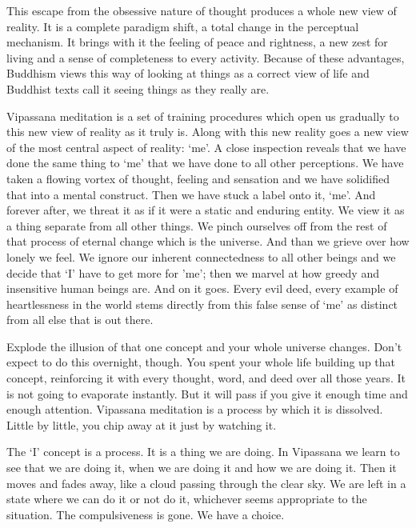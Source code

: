 This escape from the obsessive nature of thought produces a whole new view of
reality. It is a complete paradigm shift, a total change in the perceptual
mechanism. It brings with it the feeling of peace and rightness, a new zest for
living and a sense of completeness to every activity. Because of these
advantages, Buddhism views this way of looking at things as a correct view of
life and Buddhist texts call it seeing things as they really are.

Vipassana meditation is a set of training procedures which open us gradually to
this new view of reality as it truly is. Along with this new reality goes a new
view of the most central aspect of reality: `me'. A close inspection reveals
that we have done the same thing to `me' that we have done to all other
perceptions. We have taken a flowing vortex of thought, feeling and sensation
and we have solidified that into a mental construct. Then we have stuck a label
onto it, `me'. And forever after, we threat it as if it were a static and
enduring entity. We view it as a thing separate from all other things. We pinch
ourselves off from the rest of that process of eternal change which is the
universe. And than we grieve over how lonely we feel. We ignore our inherent
connectedness to all other beings and we decide that `I' have to get more for
'me'; then we marvel at how greedy and insensitive human beings are. And on it
goes. Every evil deed, every example of heartlessness in the world stems
directly from this false sense of `me' as distinct from all else that is out
there.

Explode the illusion of that one concept and your whole universe changes. Don't
expect to do this overnight, though. You spent your whole life building up that
concept, reinforcing it with every thought, word, and deed over all those years.
It is not going to evaporate instantly. But it will pass if you give it enough
time and enough attention. Vipassana meditation is a process by which it is
dissolved. Little by little, you chip away at it just by watching it.

The `I' concept is a process. It is a thing we are doing. In Vipassana we learn
to see that we are doing it, when we are doing it and how we are doing it. Then
it moves and fades away, like a cloud passing through the clear sky. We are left
in a state where we can do it or not do it, whichever seems appropriate to the
situation. The compulsiveness is gone. We have a choice.

